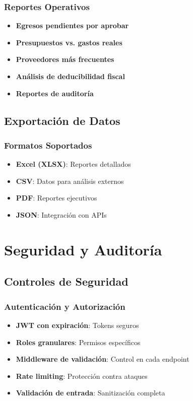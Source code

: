 \documentclass[12pt,a4paper]{article}
\newcommand{\success}[1]{\textcolor{secondarygreen}{\textbf{#1}}}
\begin{document}
\subsubsection{Reportes Operativos}
\begin{itemize}[leftmargin=*]
    \item \success{Egresos pendientes por aprobar}
    \item \success{Presupuestos vs. gastos reales}
    \item \success{Proveedores más frecuentes}
    \item \success{Análisis de deducibilidad fiscal}
    \item \success{Reportes de auditoría}
\end{itemize}

\subsection{Exportación de Datos}

\subsubsection{Formatos Soportados}
\begin{itemize}[leftmargin=*]
    \item \success{Excel (XLSX)}: Reportes detallados
    \item \success{CSV}: Datos para análisis externos
    \item \success{PDF}: Reportes ejecutivos
    \item \success{JSON}: Integración con APIs
\end{itemize}


\section{Seguridad y Auditoría}

\subsection{Controles de Seguridad}

\subsubsection{Autenticación y Autorización}
\begin{itemize}[leftmargin=*]
    \item \success{JWT con expiración}: Tokens seguros
    \item \success{Roles granulares}: Permisos específicos
    \item \success{Middleware de validación}: Control en cada endpoint
    \item \success{Rate limiting}: Protección contra ataques
    \item \success{Validación de entrada}: Sanitización completa
\end{itemize}
\end{document}
